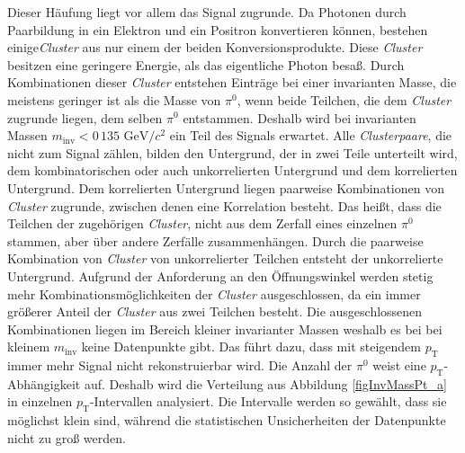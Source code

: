 Dieser Häufung liegt vor allem das Signal zugrunde.
Da Photonen durch Paarbildung in ein Elektron und ein Positron konvertieren können, bestehen einige\textit{Cluster} aus nur einem der beiden Konversionsprodukte.
Diese \textit{Cluster} besitzen eine geringere Energie, als das eigentliche Photon besaß.
Durch Kombinationen dieser \textit{Cluster} entstehen Einträge bei einer invarianten Masse, die meistens geringer ist als die Masse von $\pi^{0}$, wenn beide Teilchen, die dem \textit{Cluster} zugrunde liegen, dem selben $\pi^{0}$ entstammen.
Deshalb wird bei invarianten Massen $m_\text{inv}<0\,135\text{ GeV}/c^{2}$ ein Teil des Signals erwartet.
\newline
Alle \textit{Clusterpaare}, die nicht zum Signal zählen, bilden den Untergrund, der in zwei Teile unterteilt wird, dem kombinatorischen oder auch unkorrelierten Untergrund und dem korrelierten Untergrund.
Dem korrelierten Untergrund liegen paarweise Kombinationen von \textit{Cluster} zugrunde, zwischen denen eine Korrelation besteht.
Das heißt, dass die Teilchen der zugehörigen \textit{Cluster}, nicht aus dem Zerfall eines einzelnen $\pi^{0}$ stammen, aber über andere Zerfälle zusammenhängen.
Durch die paarweise Kombination von \textit{Cluster} von unkorrelierter Teilchen entsteht der unkorrelierte Untergrund.
\newline
Aufgrund der Anforderung an den Öffnungswinkel werden stetig mehr Kombinationsmöglichkeiten der \textit{Cluster} ausgeschlossen, da ein immer  größerer Anteil der \textit{Cluster} aus zwei Teilchen besteht.
Die ausgeschlossenen Kombinationen liegen im Bereich kleiner invarianter Massen weshalb es bei bei kleinem $m_{\text{inv}}$ keine Datenpunkte gibt.
Das führt dazu, dass mit steigendem $p_{\text{T}}$ immer mehr Signal nicht rekonstruierbar wird.
\newline
Die Anzahl der $\pi^{0}$ weist eine $p_{\text{T}}$-Abhängigkeit auf.
Deshalb wird die Verteilung aus Abbildung \ref{figInvMassPt_a} in einzelnen $p_{\text{T}}$-Intervallen analysiert.
Die Intervalle werden so gewählt, dass sie möglichst klein sind, während die statistischen Unsicherheiten der Datenpunkte nicht zu groß werden.
